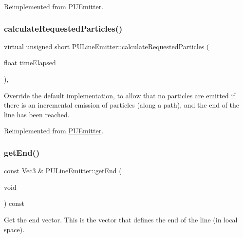Reimplemented from \hyperlink{classPUEmitter}{P\+U\+Emitter}.

\mbox{\label{classPULineEmitter_a801b15386630dc636dfb6e3f3f74cb06}} 
\subsubsection{\texorpdfstring{calculate\+Requested\+Particles()}{calculateRequestedParticles()}\hspace{0.1cm}{\footnotesize\ttfamily [2/2]}}
{\footnotesize\ttfamily virtual unsigned short P\+U\+Line\+Emitter\+::calculate\+Requested\+Particles (\begin{DoxyParamCaption}\item[{float}]{time\+Elapsed }\end{DoxyParamCaption})\hspace{0.3cm}{\ttfamily [override]}, {\ttfamily [virtual]}}

Override the default implementation, to allow that no particles are emitted if there is an incremental emission of particles (along a path), and the end of the line has been reached. 

Reimplemented from \hyperlink{classPUEmitter}{P\+U\+Emitter}.

\mbox{\label{classPULineEmitter_ab12c183f1105751b783bd8846eb70693}} 
\subsubsection{\texorpdfstring{get\+End()}{getEnd()}\hspace{0.1cm}{\footnotesize\ttfamily [1/2]}}
{\footnotesize\ttfamily const \hyperlink{classVec3}{Vec3} \& P\+U\+Line\+Emitter\+::get\+End (\begin{DoxyParamCaption}\item[{void}]{ }\end{DoxyParamCaption}) const}

Get the end vector. This is the vector that defines the end of the line (in local space). \mbox{\label{classPULineEmitter_abe794d225bfad8ad0078ffd99599c559}} 
